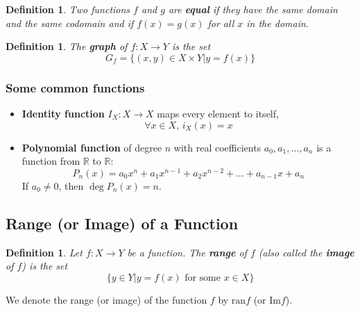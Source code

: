 \documentclass[10pt,reqno]{book}
\theoremstyle{plain}
\newtheorem{definition}[theorem]{Definition}
\def\R{\mathbb{R}}
\def\ran{\text{ran}}
\def\image{\text{Im}}
\begin{document}
	\begin{center}
	\end{center}
	
	\begin{definition}
		Two functions $ f $ and $ g $ are \textbf{equal} if they have the same domain and the same codomain and if $ f(x) = g(x) $ for all $ x $ in the domain.
	\end{definition}

	\begin{definition}
		The \textbf{graph} of $ f: X \to Y $ is the set
		\[ G_f = \{ (x,y) \in X \times Y | y= f(x) \} \]
	\end{definition}
	
	\subsubsection*{Some common functions}
	
	\begin{itemize}
		\item \textbf{Identity function} $ I_X: X \to X $ maps every element to itself,
			\[ \forall x \in X, \, i_X (x) = x \]
		\item \textbf{Polynomial function} of degree $ n $ with real coefficients $ a_0,a_1,\dots, a_n $ is a function from $ \R $ to $ \R $:
			\[ P_n(x) = a_0x^n + a_1 x^{n-1} + a_2 x^{n-2} + \dots + a_{n-1} x + a_n \]
			If $ a_0 \neq 0 $, then $ \deg P_n(x) = n $.
	\end{itemize}
	
	\subsection*{Range (or Image) of a Function}
	
	\begin{definition}
		Let $ f: X \to Y $ be a function. The \textbf{range} of $ f $ (also called the \textbf{image} of $ f $) is the set 
		\[ \{ y \in Y | y= f(x) \text{ for some } x \in X \} \]
	\end{definition}
	We denote the range (or image) of the function $ f $ by $ \ran f $ (or $ \image f $).
	
\end{document}
